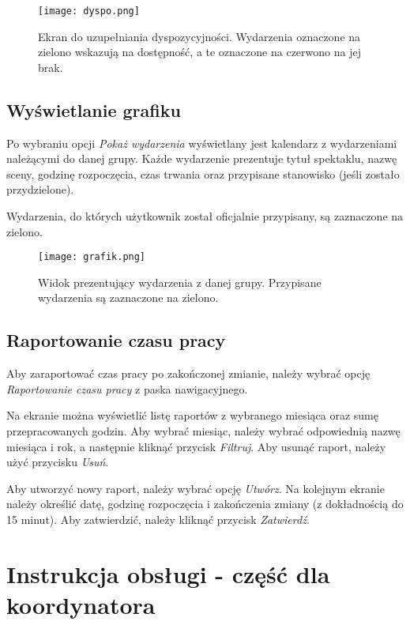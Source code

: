 \documentclass[shortabstract]{iithesis}
\begin{document}
\begin{figure}[h!]
    \centering
    \texttt{[image: dyspo.png]}
    \caption{Ekran do uzupełniania dyspozycyjności. Wydarzenia oznaczone na zielono wskazują na dostępność, a te oznaczone na czerwono na jej brak.}
    \label{fig:availability}
\end{figure}

\subsection{Wyświetlanie grafiku}

Po wybraniu opcji \textit{Pokaż wydarzenia} wyświetlany jest kalendarz z wydarzeniami należącymi do danej grupy. Każde wydarzenie prezentuje tytuł spektaklu, nazwę sceny, godzinę rozpoczęcia, czas trwania oraz przypisane stanowisko (jeśli zostało przydzielone).

Wydarzenia, do których użytkownik został oficjalnie przypisany, są zaznaczone na zielono.

\begin{figure}[h!]
    \centering
    \texttt{[image: grafik.png]}
    \caption{Widok prezentujący wydarzenia z danej grupy. Przypisane wydarzenia są zaznaczone na zielono.}
    \label{fig:schedule}
\end{figure}

\subsection{Raportowanie czasu pracy}

Aby zaraportować czas pracy po zakończonej zmianie, należy wybrać opcję \textit{Raportowanie czasu pracy} z paska nawigacyjnego.

Na ekranie można wyświetlić listę raportów z wybranego miesiąca oraz sumę przepracowanych godzin. Aby wybrać miesiąc, należy wybrać odpowiednią nazwę miesiąca i rok, a następnie kliknąć przycisk \textit{Filtruj}. Aby usunąć raport, należy użyć przycisku \textit{Usuń}.


Aby utworzyć nowy raport, należy wybrać opcję \textit{Utwórz}. Na kolejnym ekranie należy określić datę, godzinę rozpoczęcia i zakończenia zmiany (z dokładnością do 15 minut). Aby zatwierdzić, należy kliknąć przycisk \textit{Zatwierdź}.

\section{Instrukcja obsługi - część dla koordynatora}
\end{document}
